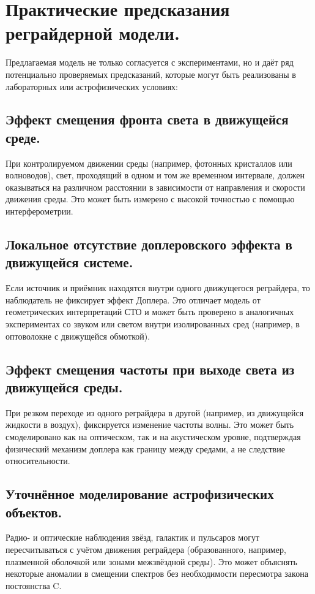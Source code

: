 \documentclass[12pt]{article}
\begin{document}
\section*{Практические предсказания реграйдерной модели.}

Предлагаемая модель не только согласуется с экспериментами, но и даёт ряд потенциально проверяемых предсказаний, которые могут быть реализованы в лабораторных или астрофизических условиях:

\subsection{Эффект смещения фронта света в движущейся среде.}
При контролируемом движении среды (например, фотонных кристаллов или волноводов), свет, проходящий в одном и том же временном интервале, должен оказываться на различном расстоянии в зависимости от направления и скорости движения среды. Это может быть измерено с высокой точностью с помощью интерферометрии.

\subsection{Локальное отсутствие доплеровского эффекта в движущейся системе.}
Если источник и приёмник находятся внутри одного движущегося реграйдера, то наблюдатель не фиксирует эффект Доплера. Это отличает модель от геометрических интерпретаций СТО и может быть проверено в аналогичных экспериментах со звуком или светом внутри изолированных сред (например, в оптоволокне с движущейся обмоткой).

\subsection{Эффект смещения частоты при выходе света из движущейся среды.}
При резком переходе из одного реграйдера в другой (например, из движущейся жидкости в воздух), фиксируется изменение частоты волны. Это может быть смоделировано как на оптическом, так и на акустическом уровне, подтверждая физический механизм доплера как границу между средами, а не следствие относительности.

\subsection{Уточнённое моделирование астрофизических объектов.}
Радио- и оптические наблюдения звёзд, галактик и пульсаров могут пересчитываться с учётом движения реграйдера (образованного, например, плазменной оболочкой или зонами межзвёздной среды). Это может объяснять некоторые аномалии в смещении спектров без необходимости пересмотра закона постоянства C.
\end{document}
